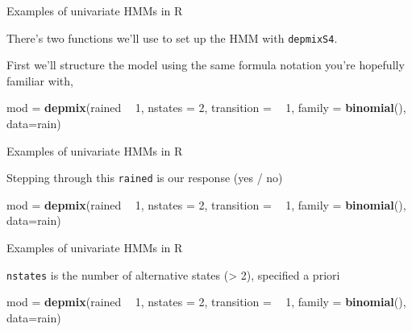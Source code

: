 \documentclass[
  ignorenonframetext,
]{beamer}
\newenvironment{Shaded}{\begin{snugshade}}{\end{snugshade}}
\newcommand{\DataTypeTok}[1]{\textcolor[rgb]{0.13,0.29,0.53}{#1}}
\newcommand{\DecValTok}[1]{\textcolor[rgb]{0.00,0.00,0.81}{#1}}
\newcommand{\KeywordTok}[1]{\textcolor[rgb]{0.13,0.29,0.53}{\textbf{#1}}}
\newcommand{\NormalTok}[1]{#1}
\newcommand{\OperatorTok}[1]{\textcolor[rgb]{0.81,0.36,0.00}{\textbf{#1}}}
\newcommand{\StringTok}[1]{\textcolor[rgb]{0.31,0.60,0.02}{#1}}
\begin{document}
\begin{frame}[fragile]{Examples of univariate HMMs in R}
\protect\hypertarget{examples-of-univariate-hmms-in-r-6}{}

There's two functions we'll use to set up the HMM with
\texttt{depmixS4}.

First we'll structure the model using the same formula notation you're
hopefully familiar with,

\begin{Shaded}
\begin{Highlighting}[]
\NormalTok{mod =}\StringTok{ }\KeywordTok{depmix}\NormalTok{(rained }\OperatorTok{~}\StringTok{ }\DecValTok{1}\NormalTok{, }
             \DataTypeTok{nstates =} \DecValTok{2}\NormalTok{, }
             \DataTypeTok{transition =} \OperatorTok{~}\StringTok{ }\DecValTok{1}\NormalTok{,}
             \DataTypeTok{family =} \KeywordTok{binomial}\NormalTok{(),}
             \DataTypeTok{data=}\NormalTok{rain)}
\end{Highlighting}
\end{Shaded}

\end{frame}

\begin{frame}[fragile]{Examples of univariate HMMs in R}
\protect\hypertarget{examples-of-univariate-hmms-in-r-7}{}

Stepping through this \texttt{rained} is our response (yes / no)

\begin{Shaded}
\begin{Highlighting}[]
\NormalTok{mod =}\StringTok{ }\KeywordTok{depmix}\NormalTok{(rained }\OperatorTok{~}\StringTok{ }\DecValTok{1}\NormalTok{, }
             \DataTypeTok{nstates =} \DecValTok{2}\NormalTok{, }
             \DataTypeTok{transition =} \OperatorTok{~}\StringTok{ }\DecValTok{1}\NormalTok{,}
             \DataTypeTok{family =} \KeywordTok{binomial}\NormalTok{(),}
             \DataTypeTok{data=}\NormalTok{rain)}
\end{Highlighting}
\end{Shaded}

\end{frame}

\begin{frame}[fragile]{Examples of univariate HMMs in R}
\protect\hypertarget{examples-of-univariate-hmms-in-r-8}{}

\texttt{nstates} is the number of alternative states (\textgreater{} 2),
specified a priori

\begin{Shaded}
\begin{Highlighting}[]
\NormalTok{mod =}\StringTok{ }\KeywordTok{depmix}\NormalTok{(rained }\OperatorTok{~}\StringTok{ }\DecValTok{1}\NormalTok{, }
             \DataTypeTok{nstates =} \DecValTok{2}\NormalTok{, }
             \DataTypeTok{transition =} \OperatorTok{~}\StringTok{ }\DecValTok{1}\NormalTok{,}
             \DataTypeTok{family =} \KeywordTok{binomial}\NormalTok{(),}
             \DataTypeTok{data=}\NormalTok{rain)}
\end{Highlighting}
\end{Shaded}

\end{frame}
\end{document}
